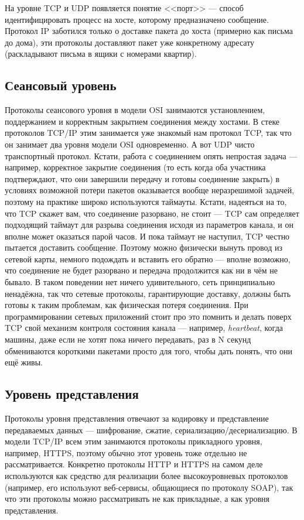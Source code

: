 \documentclass{../../text-style}
\begin{document}
На уровне TCP и UDP появляется понятие <<порт>> --- способ идентифицировать процесс на хосте, которому предназначено сообщение. Протокол IP заботился только о доставке пакета до хоста (примерно как письма до дома), эти протоколы доставляют пакет уже конкретному адресату (раскладывают письма в ящики с номерами квартир).

\subsection{Сеансовый уровень}

Протоколы сеансового уровня в модели OSI занимаются установлением, поддержанием и корректным закрытием соединения между хостами. В стеке протоколов TCP/IP этим занимается уже знакомый нам протокол TCP, так что он занимает два уровня модели OSI одновременно. А вот UDP чисто транспортный протокол. Кстати, работа с соединением опять непростая задача --- например, корректное закрытие соединения (то есть когда оба участника подтверждают, что они завершили передачу и готовы соединение закрыть) в условиях возможной потери пакетов оказывается вообще неразрешимой задачей, поэтому на практике широко используются таймауты. Кстати, надеяться на то, что TCP скажет вам, что соединение разорвано, не стоит --- TCP сам определяет подходящий таймаут для разрыва соединения исходя из параметров канала, и он вполне может оказаться парой часов. И пока таймаут не наступил, TCP честно пытается доставить сообщение. Поэтому можно физически вынуть провод из сетевой карты, немного подождать и вставить его обратно --- вполне возможно, что соединение не будет разорвано и передача продолжится как ни в чём не бывало. В таком поведении нет ничего удивительного, сеть принципиально ненадёжна, так что сетевые протоколы, гарантирующие доставку, должны быть готовы к таким проблемам, как физическая потеря соединения. При программировании сетевых приложений стоит про это помнить и делать поверх TCP свой механизм контроля состояния канала --- например, \textit{heartbeat}, когда машины, даже если не хотят пока ничего передавать, раз в N секунд обмениваются короткими пакетами просто для того, чтобы дать понять, что они ещё живы.

\subsection{Уровень представления}

Протоколы уровня представления отвечают за кодировку и представление передаваемых данных --- шифрование, сжатие, сериализацию/десериализацию. В модели TCP/IP всем этим занимаются протоколы прикладного уровня, например, HTTPS, поэтому обычно этот уровень тоже отдельно не рассматривается. Конкретно протоколы HTTP и HTTPS на самом деле используются как средство для реализации более высокоуровневых протоколов (например, его используют веб-сервисы, общающиеся по протоколу SOAP), так что эти протоколы можно рассматривать не как прикладные, а как уровня представления.
\end{document}
